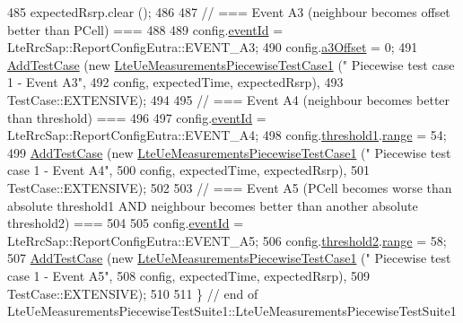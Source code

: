 \begin{DoxyCode}
485   expectedRsrp.clear ();
486 
487   \textcolor{comment}{// === Event A3 (neighbour becomes offset better than PCell) ===}
488 
489   config.\hyperlink{structns3_1_1LteRrcSap_1_1ReportConfigEutra_a1fbe931cc9584614d20f4affbce70d8a}{eventId} = LteRrcSap::ReportConfigEutra::EVENT\_A3;
490   config.\hyperlink{structns3_1_1LteRrcSap_1_1ReportConfigEutra_ae3226d3c9ec9988fefee04790ac6c9f6}{a3Offset} = 0;
491   \hyperlink{classns3_1_1TestCase_a3718088e3eefd5d6454569d2e0ddd835}{AddTestCase} (\textcolor{keyword}{new} \hyperlink{classLteUeMeasurementsPiecewiseTestCase1}{LteUeMeasurementsPiecewiseTestCase1} (\textcolor{stringliteral}{"
      Piecewise test case 1 - Event A3"},
492                                                         config, expectedTime, expectedRsrp),
493                TestCase::EXTENSIVE);
494 
495   \textcolor{comment}{// === Event A4 (neighbour becomes better than threshold) ===}
496 
497   config.\hyperlink{structns3_1_1LteRrcSap_1_1ReportConfigEutra_a1fbe931cc9584614d20f4affbce70d8a}{eventId} = LteRrcSap::ReportConfigEutra::EVENT\_A4;
498   config.\hyperlink{structns3_1_1LteRrcSap_1_1ReportConfigEutra_a8f36bc45a61054920e490be8bf33b4ca}{threshold1}.\hyperlink{structns3_1_1LteRrcSap_1_1ThresholdEutra_abd4950e20a1a93727535e8364bf85b03}{range} = 54;
499   \hyperlink{classns3_1_1TestCase_a3718088e3eefd5d6454569d2e0ddd835}{AddTestCase} (\textcolor{keyword}{new} \hyperlink{classLteUeMeasurementsPiecewiseTestCase1}{LteUeMeasurementsPiecewiseTestCase1} (\textcolor{stringliteral}{"
      Piecewise test case 1 - Event A4"},
500                                                         config, expectedTime, expectedRsrp),
501                TestCase::EXTENSIVE);
502 
503   \textcolor{comment}{// === Event A5 (PCell becomes worse than absolute threshold1 AND neighbour becomes better than another
       absolute threshold2) ===}
504 
505   config.\hyperlink{structns3_1_1LteRrcSap_1_1ReportConfigEutra_a1fbe931cc9584614d20f4affbce70d8a}{eventId} = LteRrcSap::ReportConfigEutra::EVENT\_A5;
506   config.\hyperlink{structns3_1_1LteRrcSap_1_1ReportConfigEutra_a4c76552279ea09626d15b48b341bfbd1}{threshold2}.\hyperlink{structns3_1_1LteRrcSap_1_1ThresholdEutra_abd4950e20a1a93727535e8364bf85b03}{range} = 58;
507   \hyperlink{classns3_1_1TestCase_a3718088e3eefd5d6454569d2e0ddd835}{AddTestCase} (\textcolor{keyword}{new} \hyperlink{classLteUeMeasurementsPiecewiseTestCase1}{LteUeMeasurementsPiecewiseTestCase1} (\textcolor{stringliteral}{"
      Piecewise test case 1 - Event A5"},
508                                                         config, expectedTime, expectedRsrp),
509                TestCase::EXTENSIVE);
510 
511 \} \textcolor{comment}{// end of LteUeMeasurementsPiecewiseTestSuite1::LteUeMeasurementsPiecewiseTestSuite1}
\end{DoxyCode}


